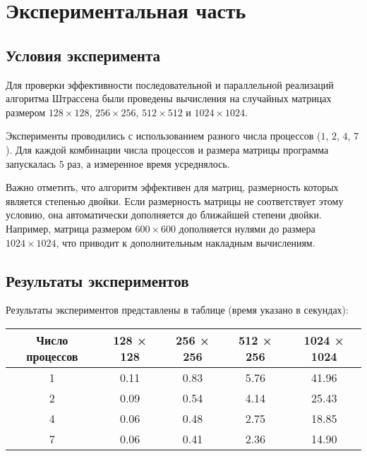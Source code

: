 \documentclass[a4paper, 14pt]{extarticle}
\begin{document}
    \newpage
    \section{Экспериментальная часть}
\subsection{Условия эксперимента}
Для проверки эффективности последовательной и параллельной реализаций алгоритма Штрассена были проведены вычисления на случайных матрицах размером \(128 \times 128\), \(256 \times 256\), \(512 \times 512\) и \(1024 \times 1024\).  

Эксперименты проводились с использованием разного числа процессов (\(1\), \(2\), \(4\), \(7\)). Для каждой комбинации числа процессов и размера матрицы программа запускалась \(5\) раз, а измеренное время усреднялось.  

Важно отметить, что алгоритм эффективен для матриц, размерность которых является степенью двойки. Если размерность матрицы не соответствует этому условию, она автоматически дополняется до ближайшей степени двойки. Например, матрица размером \(600 \times 600\) дополняется нулями до размера \(1024 \times 1024\), что приводит к дополнительным накладным вычислениям.


\subsection{Результаты экспериментов}
Результаты экспериментов представлены в таблице (время указано в секундах):

\begin{table}[H]
\begin{tabular}{|c|c|c|c|c|}
\hline
Число процессов & 128 × 128 & 256 × 256 & 512 × 256 & 1024 × 1024 \\ \hline
1               & 0.11      & 0.83      & 5.76      & 41.96       \\ \hline
2               & 0.09      & 0.54      & 4.14      & 25.43       \\ \hline
4               & 0.06      & 0.48      & 2.75      & 18.85       \\ \hline
7               & 0.06      & 0.41      & 2.36      & 14.90       \\ \hline
\end{tabular}
\end{table}
\end{document}
